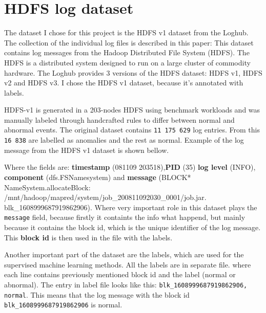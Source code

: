 \section{HDFS log dataset} \label{hdfs}

The dataset I chose for this project is the HDFS v1 dataset from the Loghub. The collection of the individual log files is described in this paper: %
This dataset contains log messages from the Hadoop Distributed File System (HDFS). The HDFS is a distributed 
system designed to run on a large cluster of commodity hardware. The Loghub provides 3 versions of the HDFS dataset: HDFS v1, HDFS v2 and HDFS v3. I chose the HDFS v1 dataset, because it's annotated with labels.

HDFS-v1 is generated in a 203-nodes HDFS using benchmark workloads and was manually labeled through handcrafted rules to differ between normal and abnormal events. The original dataset contains \texttt{11 175 629} log entries.
From this \texttt{16 838} are labelled as anomalies and the rest as normal. Example of the log message from the HDFS v1 dataset is shown bellow.

\begin{center}
\end{center}

Where the fields are: \textbf{timestamp} (081109 203518),\textbf{PID} (35) \textbf{log level} (INFO), \textbf{component} (dfs.FSNamesystem) and \textbf{message} (BLOCK* NameSystem.allocateBlock: /mnt/hadoop/mapred/system/job\_200811092030\_0001/job.jar. blk\_1608999687919862906).
Where very important role in this dataset plays the \texttt{message} field, because firstly it containts the info what happend, but mainly because it contains the block id, which is the unique identifier of the log message.
This \textbf{block id} is then used in the file with the labels.

Another important part of the dataset are the labels, which are used for the supervised machine learning methods. All the labels are in separate file. where each line contains previously mentioned block id and the label (normal or abnormal).
The entry in label file looks like this: \texttt{blk\_1608999687919862906, normal}. This means that the log message with the block id \texttt{blk\_1608999687919862906} is normal.

